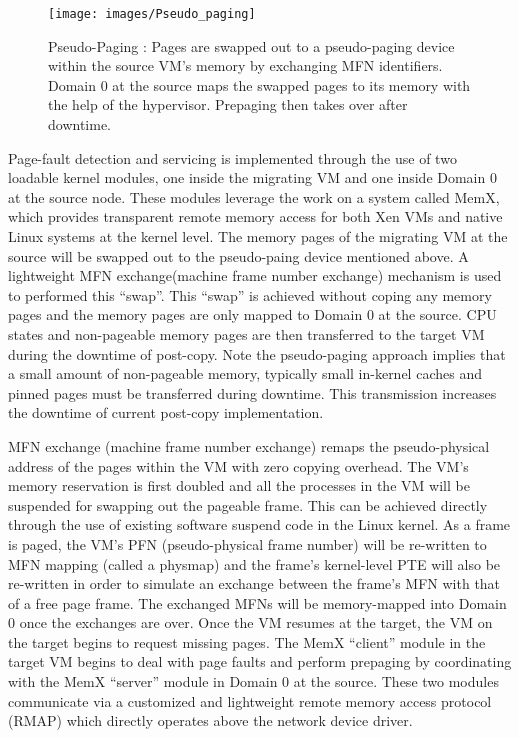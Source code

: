\documentclass[runningheads]{llncs}
\begin{document}
\begin{figure}
\centering
\texttt{[image: images/Pseudo\_paging]}
\caption{Pseudo-Paging : Pages are swapped out to a pseudo-paging device within the source VM’s memory by exchanging MFN identifiers. Domain 0 at the source maps the swapped pages to its memory with the help of the hypervisor. Prepaging then takes over after downtime. }
\end{figure}
Page-fault detection and servicing is implemented through the use of two loadable kernel modules, one inside the migrating VM and one inside Domain 0 at the source node. These modules leverage the work on a system called MemX\cite{hines2007memx}, which provides transparent remote memory access for both Xen VMs and native Linux systems at the kernel level. The memory pages of the migrating VM at the source will be swapped out to the pseudo-paing device mentioned above. A lightweight MFN exchange(machine frame number exchange) mechanism is used to performed this “swap”. This “swap” is achieved without coping any memory pages and the memory pages are only mapped to Domain 0 at the source. CPU states and non-pageable memory pages are then transferred to the target VM during the downtime of post-copy. Note the pseudo-paging approach implies that a small amount of non-pageable memory, typically small in-kernel caches and pinned pages must be transferred during downtime. This transmission increases the downtime of current post-copy implementation.

MFN exchange (machine frame number exchange) remaps the pseudo-physical address of the pages  within the VM with zero copying overhead. The VM's memory reservation is first doubled and all the processes in the VM will be suspended for swapping out the pageable frame. This can be achieved directly through the use of existing software suspend code in the Linux kernel. As a frame is paged, the VM’s PFN (pseudo-physical frame number) will be re-written to MFN mapping (called a physmap) and the frame’s kernel-level PTE will also be re-written in order to simulate an exchange between the frame’s MFN with that of a free page frame. The exchanged MFNs will be memory-mapped into Domain 0 once the exchanges are over. Once the VM resumes at the target, the VM on the target begins to request missing pages. The MemX “client” module in the target VM begins to deal with page faults and perform prepaging by coordinating with the MemX “server” module in Domain 0 at the source. These two modules communicate via a customized and lightweight remote memory access protocol (RMAP) which directly operates above the network device driver.
\end{document}
